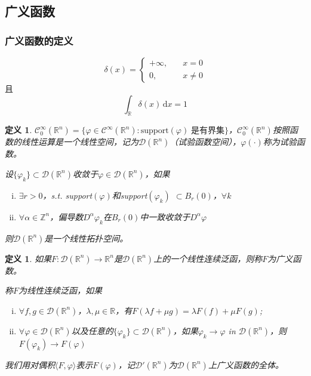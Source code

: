 \documentclass[11pt, a4paper]{article}
\theoremstyle{theorem}
\newtheorem{definition}[thm]{定义}
\newcommand{\intd}[1]{\,\mathrm{d}{#1}}
\begin{document}
\subsection{广义函数}

\subsubsection{广义函数的定义}
$$
\delta(x) = \begin{cases}
+ \infty, \quad &x = 0 \\
0, \quad &x \neq 0
\end{cases}
$$
且
$$
\int_{\mathbb{R}} \delta(x) \intd x = 1
$$

\begin{definition}
$\mathcal{C}_0^\infty(\mathbb{R}^n) = \{\varphi \in \mathcal{C}^\infty(\mathbb{R}^n): \text{support}(\varphi) \; \text{是有界集}\}$，$\mathcal{C}_0^\infty(\mathbb{R}^n)$按照函数的线性运算是一个线性空间，记为$\mathcal{D}(\mathbb{R}^n)$（试验函数空间），$\varphi(\cdot)$称为试验函数。

设$\{\varphi_k\} \subset \mathcal{D}(\mathbb{R}^n)$收敛于$\varphi \in \mathcal{D}(\mathbb{R}^n)$，如果
\begin{enumerate}[(i)]
  \item $\exists r > 0$，s.t. support$(\varphi)$和support$(\varphi_k)$ $\subset B_r(0)$，$\forall k$
  \item $\forall \alpha \in \mathbb{Z}^n$，偏导数$D^\alpha \varphi_k$在$B_r(0)$中一致收敛于$D^\alpha \varphi$
\end{enumerate}
则$\mathcal{D}(\mathbb{R}^n)$是一个线性拓扑空间。
\end{definition}

\begin{definition}
如果$F: \mathcal{D}(\mathbb{R}^n) \rightarrow \mathbb{R}^n$是$\mathcal{D}(\mathbb{R}^n)$上的一个线性连续泛函，则称$F$为广义函数。

称$F$为线性连续泛函，如果
\begin{enumerate}[(i)]
  \item $\forall f, g \in \mathcal{D}(\mathbb{R}^n)$，$\lambda, \mu \in \mathbb{R}$，有$F(\lambda f + \mu g) = \lambda F(f) + \mu F(g)$;
  \item $\forall \varphi \in \mathcal{D}(\mathbb{R}^n)$以及任意的$\{\varphi_k\} \subset \mathcal{D}(\mathbb{R}^n)$，如果$\varphi_k \rightarrow \varphi$ in $\mathcal{D}(\mathbb{R}^n)$，则$F(\varphi_k) \rightarrow F(\varphi)$
\end{enumerate}
我们用对偶积$\langle F, \varphi \rangle$表示$F(\varphi)$，记$\mathcal{D}'(\mathbb{R}^n)$为$\mathcal{D}(\mathbb{R}^n)$上广义函数的全体。
\end{definition}
\end{document}
